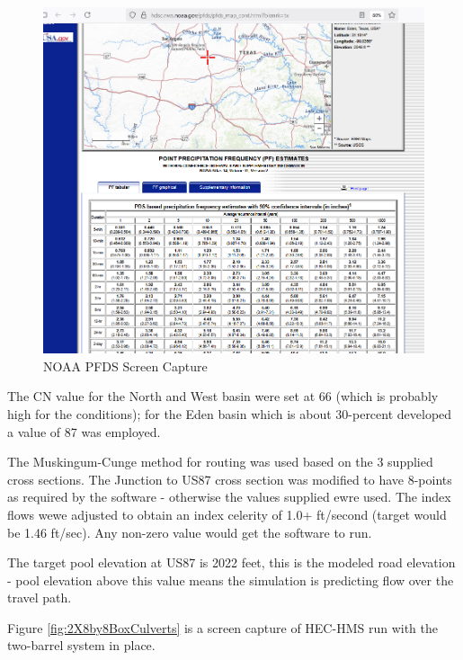 \documentclass[12pt]{article}
\begin{document}
\begin{figure}[h!] %
   \centering
   \includegraphics[width=6in]{pointdepth.png} 
   \caption{NOAA PFDS Screen Capture}
   \label{fig:pointdepth}
\end{figure}

The CN value for the North and West basin were set at 66 (which is probably high for the conditions); for the Eden basin which is about 30-percent developed a value of 87 was employed.

The Muskingum-Cunge method for routing was used based on the 3 supplied cross sections.  The Junction to US87 cross section was modified to have 8-points as required by the software - otherwise the values supplied ewre used.  The index flows wewe adjusted to obtain an index celerity of 1.0+ ft/second (target would be 1.46 ft/sec).  Any non-zero value would get the software to run.

The target pool elevation at US87 is 2022 feet, this is the modeled road elevation - pool elevation above this value means the simulation is predicting flow over the travel path.  

Figure \ref{fig:2X8by8BoxCulverts} is a screen capture of HEC-HMS run with the two-barrel system in place.
\end{document}
